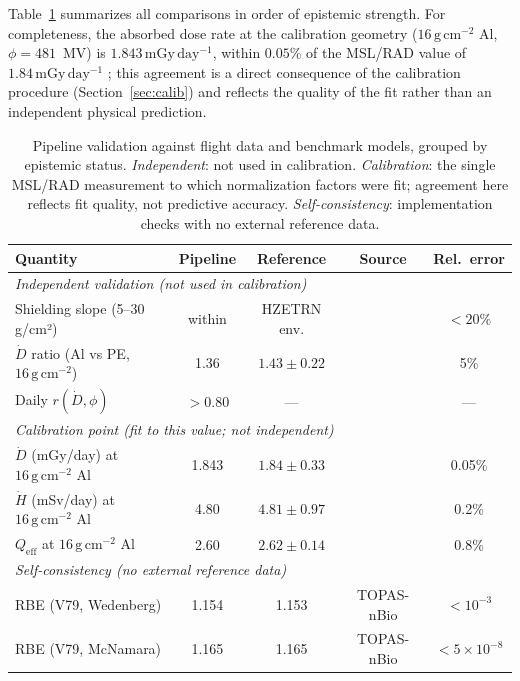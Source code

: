 \documentclass[12pt,letterpaper]{article}
\newcommand{\gcm}{\,\mathrm{g\,cm^{-2}}}
\newcommand{\mGyday}{\,\mathrm{mGy\,day^{-1}}}
\newcommand{\Qeff}{Q_\mathrm{eff}}
\begin{document}
Table~\ref{tab:validation} summarizes all comparisons in order of
epistemic strength.
For completeness, the absorbed dose rate at the calibration geometry
($16\gcm$ Al, $\phi = 481$~MV) is $1.843\mGyday$, within $0.05\%$ of
the MSL/RAD value of $1.84\mGyday$ \citep{zeitlin2013}; this agreement
is a direct consequence of the calibration procedure
(Section~\ref{sec:calib}) and reflects the quality of the fit rather
than an independent physical prediction.

\begin{table}[H]
  \centering
  \caption{Pipeline validation against flight data and benchmark models,
           grouped by epistemic status.
           \textit{Independent}: not used in calibration.
           \textit{Calibration}: the single MSL/RAD measurement to which
           normalization factors were fit; agreement here reflects fit
           quality, not predictive accuracy.
           \textit{Self-consistency}: implementation checks with no
           external reference data.}
  \label{tab:validation}
  \small
  \begin{tabular}{lcccc}
    \toprule
    Quantity & Pipeline & Reference & Source & Rel.\ error \\
    \midrule
    \multicolumn{5}{l}{\textit{Independent validation (not used in calibration)}} \\
    Shielding slope (5--30 g/cm²)
      & within & HZETRN env. & \cite{slaba2014} & $<20\%$ \\
    $\dot{D}$ ratio (Al vs PE, $16\gcm$)
      & 1.36  & $1.43\pm0.22$ & \cite{mrigakshi2013} & 5\%  \\
    Daily $r(\dot{D}, \phi)$
      & $>0.80$ & ---         & \cite{zeitlin2013} & ---    \\
    \midrule
    \multicolumn{5}{l}{\textit{Calibration point (fit to this value; not independent)}} \\
    $\dot{D}$ (mGy/day) at $16\gcm$ Al
      & 1.843 & $1.84\pm0.33$ & \cite{zeitlin2013} & 0.05\% \\
    $\dot{H}$ (mSv/day) at $16\gcm$ Al
      & 4.80  & $4.81\pm0.97$ & \cite{zeitlin2013} & 0.2\%  \\
    $\Qeff$ at $16\gcm$ Al
      & 2.60  & $2.62\pm0.14$ & \cite{zeitlin2013} & 0.8\%  \\
    \midrule
    \multicolumn{5}{l}{\textit{Self-consistency (no external reference data)}} \\
    RBE (V79, Wedenberg)
      & 1.154  & 1.153  & TOPAS-nBio & $<10^{-3}$ \\
    RBE (V79, McNamara)
      & 1.165  & 1.165  & TOPAS-nBio & $<5\times10^{-8}$ \\
    \bottomrule
  \end{tabular}
\end{table}
\end{document}
